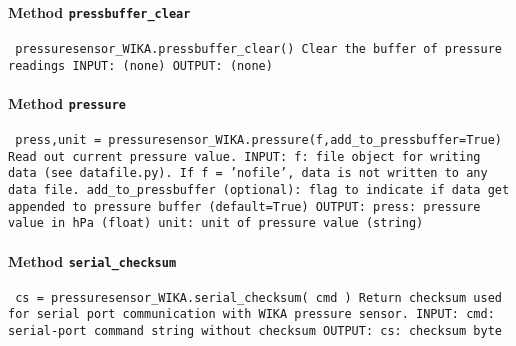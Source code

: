 \paragraph{Method \texttt{pressbuffer_clear}}
\vspace{1ex}
\texttt{\newline
pressuresensor_WIKA.pressbuffer_clear()\newline
\newline
Clear the buffer of pressure readings\newline
\newline
INPUT:\newline
(none)\newline
\newline
OUTPUT:\newline
(none)\newline
\newline
}

\paragraph{Method \texttt{pressure}}
\vspace{1ex}
\texttt{\newline
press,unit = pressuresensor_WIKA.pressure(f,add_to_pressbuffer=True)\newline
\newline
Read out current pressure value.\newline
\newline
INPUT:\newline
f: file object for writing data (see datafile.py). If f = 'nofile', data is not written to any data file.\newline
add_to_pressbuffer (optional): flag to indicate if data get appended to pressure buffer (default=True)\newline
\newline
OUTPUT:\newline
press: pressure value in hPa (float)\newline
unit: unit of pressure value (string)\newline
\newline
}

\paragraph{Method \texttt{serial_checksum}}
\vspace{1ex}
\texttt{\newline
cs = pressuresensor_WIKA.serial_checksum( cmd )\newline
\newline
Return checksum used for serial port communication with WIKA pressure sensor.\newline
\newline
INPUT:\newline
cmd: serial-port command string without checksum\newline
\newline
OUTPUT:\newline
cs: checksum byte\newline
\newline
}

